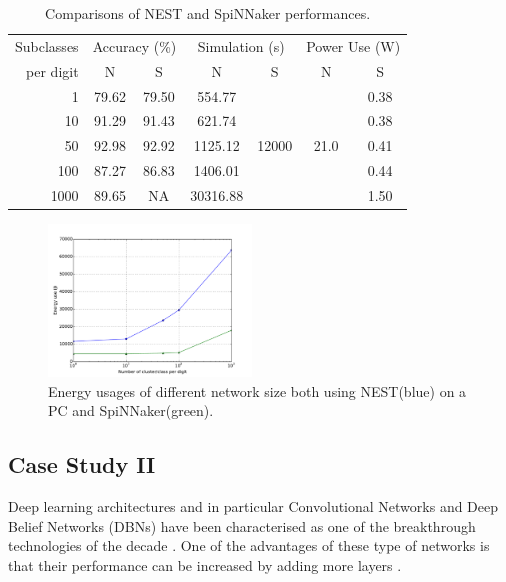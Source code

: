 \begin{table}[h]
\caption{Comparisons of NEST and SpiNNaker performances.}
\begin{center}
\begin{tabular} {r|c|c|c|c|c|c}
	 Subclasses
	 &\multicolumn{2}{c|}{Accuracy (\%)}  &\multicolumn{2}{c|}{Simulation (s)}
	 &\multicolumn{2}{c}{Power Use (W)}   \\
	 \cline{2-7}
	 per digit
	& N & S & N & S & N & S\\
    \hline
    1 & 79.62 & 79.50 & 554.77 & \multirow{5}{*}{12000} & \multirow{5}{*}{ 21.0 } & 0.38 \\
    10 & 91.29 & 91.43 & 621.74 &   &   & 0.38 \\
    50 & 92.98 & 92.92 & 1125.12 &   &   & 0.41 \\
    100 & 87.27 & 86.83 & 1406.01 &   &   & 0.44 \\
    1000 & 89.65 & NA & 30316.88 &   &   & 1.50 \\

\end{tabular}
\label{tbl:compare}
\end{center}
\end{table}

\begin{figure}[hbt!]
	\centering
	\includegraphics[width=0.48\textwidth]{images/energy.pdf}
	\caption{Energy usages of different network size both using NEST(blue) on a PC and SpiNNaker(green).}
	\label{fig:energy}
\end{figure}
\subsection{Case Study II}
Deep learning architectures and in particular Convolutional Networks \citep{lecun1998gradient} and Deep Belief Networks (DBNs) \citep{Hinton_etal_2006} have been characterised as one of the breakthrough technologies of the decade \citep{MIT_TechReview}. One of the advantages of these type of networks is that their performance can be increased by adding more layers \citep{Hinton_Contr_Divergence2006}.

